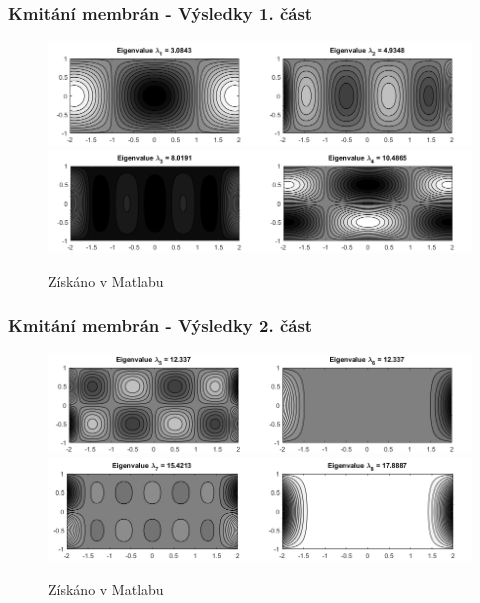 \documentclass{beamer}
\begin{document}
\begin{frame}
\frametitle{Kmitání membrán - Výsledky 1. část}
\centering
\begin{figure}
\includegraphics[width=1\linewidth]{obdelnicky1.png}
\includegraphics[width=1\linewidth]{obdelnicky2.png}
\caption{Získáno v Matlabu}
\end{figure}
\end{frame}

\begin{frame}
\frametitle{Kmitání membrán - Výsledky 2. část}
\centering
\begin{figure}
\includegraphics[width=1\linewidth]{obdelnicky3.png}
\includegraphics[width=1\linewidth]{obdelnicky4.png}
\caption{Získáno v Matlabu}
\end{figure}
\end{frame}
\end{document}
